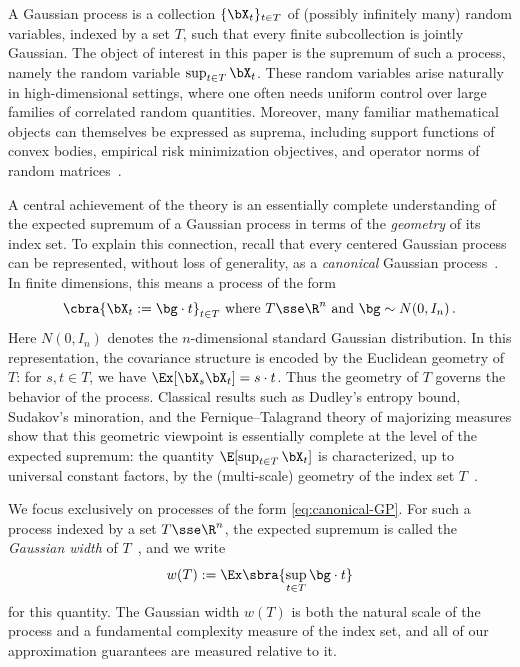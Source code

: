 \documentclass[11pt]{article}
\begin{document}
A Gaussian process is a collection $\{\bX_t\}_{t\in T}$ of (possibly infinitely many) random variables, indexed by a set $T$, such that every finite subcollection is jointly Gaussian.  
The object of interest in this paper is the supremum of such a process, namely the random variable $\sup_{t\in T} \bX_t$. 
These random variables arise naturally in high-dimensional settings, where one often needs uniform control over large families of correlated random quantities. 
Moreover, many familiar mathematical objects can themselves be expressed as suprema, including support functions of convex bodies, empirical risk minimization objectives, and operator norms of random matrices~\cite[Section~1.2.2]{rvh-notes}. 

A central achievement of the theory is an essentially complete understanding of the expected supremum of a Gaussian process in terms of the \emph{geometry} of its index set. 
To explain this connection, recall that every centered Gaussian process can be represented, without loss of generality, as a \emph{canonical} Gaussian process~\cite[Section~7.1.2]{vershynin2018high}. 
In finite dimensions, this means a process of the form 
\begin{equation} \label{eq:canonical-GP}
	\cbra{\bX_t := \bg \cdot t}_{t\in T}~\text{where}~T\sse\R^n~\text{and}~\bg\sim N(0, I_n)\,.
\end{equation}
Here $N(0, I_n)$ denotes the $n$-dimensional standard Gaussian distribution.  
In this representation, the covariance structure is encoded by the Euclidean geometry of $T$: for $s,t\in T$, we have $\Ex[\bX_s\bX_t] = s\cdot t$. 
Thus the geometry of $T$ governs the behavior of the process. 
Classical results such as Dudley's entropy bound, Sudakov's minoration, and the Fernique--Talagrand theory of majorizing measures show that this geometric viewpoint is essentially complete at the level of the expected supremum: the quantity $\E[\sup_{t\in T} \bX_t]$ is characterized, up to universal constant factors, by the (multi-scale) geometry of the index set $T$~\cite{rvh-notes,talagrand2022upper}. 

We focus exclusively on processes of the form \eqref{eq:canonical-GP}. 
For such a process indexed by a set $T\sse \R^n$, the expected supremum is called the \emph{Gaussian width} of $T$~\cite[Chapter~7]{vershynin2018high}, and we write
\[
	w(T) := \Ex \sbra{\sup_{t\in T} \bg\cdot t}
\]
for this quantity. 
The Gaussian width $w(T)$ is both the natural scale of the process and a fundamental complexity measure of the index set, and all of our approximation guarantees are measured relative to it. 
\end{document}
